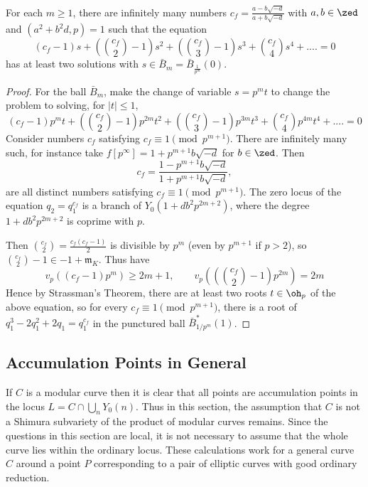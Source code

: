 \documentclass[12pt,letterpaper]{article}
\begin{document}
	\begin{lemma} \label{ExApprox}
		For each $m\geq 1$, there are infinitely many numbers $c_f = \frac{a-b\sqrt{-d}}{a+b\sqrt{-d}}$ with $a,b\in \zed$ and $(a^2+b^2d,p)=1$ such that the equation
		\[(c_f-1)s + (\binom{c_f}{2}-1) s^2 + (\binom{c_f}{3}-1)s^3 + \binom{c_f}{4} s^4 +.... =0\]
		has at least two solutions with $s\in \bar{B}_m = \bar{B}_{\frac{1}{p^m}}(0)$.
	\end{lemma}
	
	\begin{proof}
		
		For the ball $\bar{B}_m$, make the change of variable $s = p^mt$ to change the problem to solving, for $|t|\leq 1$,
		\[(c_f-1)p^mt + (\binom{c_f}{2}-1)p^{2m} t^2 + (\binom{c_f}{3}-1)p^{3m}t^3 + \binom{c_f}{4}p^{4m} t^4 +.... =0\]
		Consider numbers $c_f$ satisfying $c_f\equiv 1 \pmod{p^{m+1}}$. There are infinitely many such, for instance take $f[p^\infty]=1+p^{m+1}b\sqrt{-d}$ for $b\in \zed$. Then \[c_f = \frac{1-p^{m+1}b\sqrt{-d}}{1+p^{m+1}b\sqrt{-d}},\] are all distinct numbers satisfying $c_f\equiv 1 \pmod{p^{m+1}}$. The zero locus of the equation $q_2 = q_1^{c_f}$ is a branch of $Y_0(1+db^2p^{2m+2})$, where the degree $1+db^2p^{2m+2}$ is coprime with $p$.
		
		Then $\binom{c_f}{2} = \frac{c_f(c_f-1)}{2}$ is divisible by $p^{m}$ (even by $p^{m+1}$ if $p>2$), so $\binom{c_f}{2}-1\in -1+\mathfrak{m}_K$. Thus have
		\[v_p((c_f-1)p^m)\geq 2m+1, \qquad v_p\left(\left(\binom{c_f}{2}-1\right)p^{2m}\right)=2m\]
		Hence by Strassman's Theorem, there are at least two roots $t\in \oh_p$ of the above equation, so for every $c_f\equiv 1\pmod{p^{m+1}}$, there is a root of $q_1^3-2q_1^2+2q_1=q_1^{c_f}$ in the punctured ball $\bar{B}_{1/p^m}^*(1) $.	
	\end{proof}
	
	
	
	\subsection{Accumulation Points in General}

	
	If $C$ is a modular curve then it is clear that all points are accumulation points in the locus $L=C\cap \bigcup_nY_0(n)$. Thus in this section, the assumption that $C$ is not a Shimura subvariety of the product of modular curves remains. Since the questions in this section are local, it is not necessary to assume that the whole curve lies within the ordinary locus. These calculations work for a general curve $C$ around a point $P$ corresponding to a pair of elliptic curves with good ordinary reduction.
	
\end{document}
